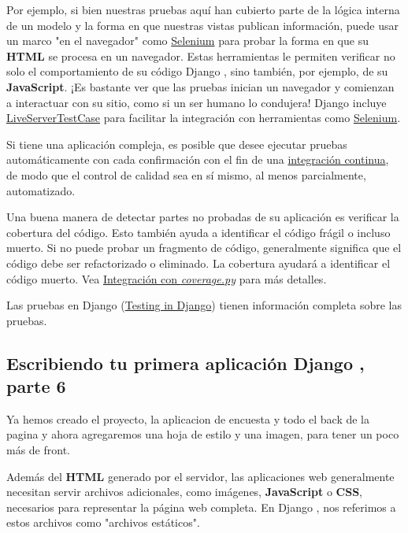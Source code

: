 \documentclass[10pt]{article}
\newcommand{\django}[1]{{\textcolor{G}{Django} #1}}
\begin{document}
Por ejemplo, si bien nuestras pruebas aquí han cubierto parte de la lógica interna de un modelo y la forma en que nuestras vistas publican información, puede usar un marco "en el navegador" como {\href{http://seleniumhq.org}{\textcolor{B}{Selenium}}}
 para probar la forma en que su \textbf{HTML} se procesa en un navegador. Estas herramientas le permiten verificar no solo el comportamiento de su código \django{}, sino también, por ejemplo, de su \textbf{JavaScript}. ¡Es bastante ver que las pruebas inician un navegador y comienzan a interactuar con su sitio, como si un ser humano lo condujera! \django{} incluye {\href{https://docs.djangoproject.com/en/3.0/topics/testing/tools/\#django.test.LiveServerTestCase}{\textcolor{B}{LiveServerTestCase}}}
 para facilitar la integración con herramientas como {\href{http://seleniumhq.org}{\textcolor{B}{Selenium}}}.

Si tiene una aplicación compleja, es posible que desee ejecutar pruebas automáticamente con cada confirmación con el fin de una {\href{https://en.wikipedia.org/wiki/Continuous\_integration}{\textcolor{B}{integración continua}}}, de modo que el control de calidad sea en sí mismo, al menos parcialmente, automatizado.

Una buena manera de detectar partes no probadas de su aplicación es verificar la cobertura del código. Esto también ayuda a identificar el código frágil o incluso muerto. Si no puede probar un fragmento de código, generalmente significa que el código debe ser refactorizado o eliminado. La cobertura ayudará a identificar el código muerto. Vea {\href{https://docs.djangoproject.com/en/3.0/topics/testing/advanced/\#topics-testing-code-coverage}{\textcolor{B}{Integración con \textit{coverage.py}}}} para más detalles.

Las pruebas en \django{} ({\href{https://docs.djangoproject.com/en/3.0/topics/testing/}{\textcolor{B}{Testing in Django}}}) tienen información completa sobre las pruebas.


\newpage
\subsection{Escribiendo tu primera aplicación \django{}, parte 6}
 Ya hemos creado el proyecto, la aplicacion de encuesta y todo el back de la pagina y ahora agregaremos una hoja de estilo y una imagen, para tener un poco más de front.

Además del \textbf{HTML} generado por el servidor, las aplicaciones web generalmente necesitan servir archivos adicionales, como imágenes, \textbf{JavaScript} o \textbf{CSS}, necesarios para representar la página web completa. En \django{}, nos referimos a estos archivos como "archivos estáticos".
\end{document}
